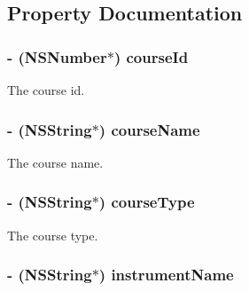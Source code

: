 \subsection{\-Property \-Documentation}
\hypertarget{interface_course_ad03513473cc83651e36749f9e5c5be69}{
\subsubsection[{course\-Id}]{\setlength{\rightskip}{0pt plus 5cm}-\/ (\-N\-S\-Number$\ast$) {\bf course\-Id}}}\label{interface_course_ad03513473cc83651e36749f9e5c5be69}
\-The course id. \hypertarget{interface_course_ace0d7cddc92e6c0d10b1cac95302e1de}{
\subsubsection[{course\-Name}]{\setlength{\rightskip}{0pt plus 5cm}-\/ (\-N\-S\-String$\ast$) {\bf course\-Name}}}\label{interface_course_ace0d7cddc92e6c0d10b1cac95302e1de}
\-The course name. \hypertarget{interface_course_a16df4d28af9a7f6e91a5aa4ce583453d}{
\subsubsection[{course\-Type}]{\setlength{\rightskip}{0pt plus 5cm}-\/ (\-N\-S\-String$\ast$) {\bf course\-Type}}}\label{interface_course_a16df4d28af9a7f6e91a5aa4ce583453d}
\-The course type. \hypertarget{interface_course_a907b62f431b16309eb1dddb6786f2456}{
\subsubsection[{instrument\-Name}]{\setlength{\rightskip}{0pt plus 5cm}-\/ (\-N\-S\-String$\ast$) {\bf instrument\-Name}}}\label{interface_course_a907b62f431b16309eb1dddb6786f2456}
